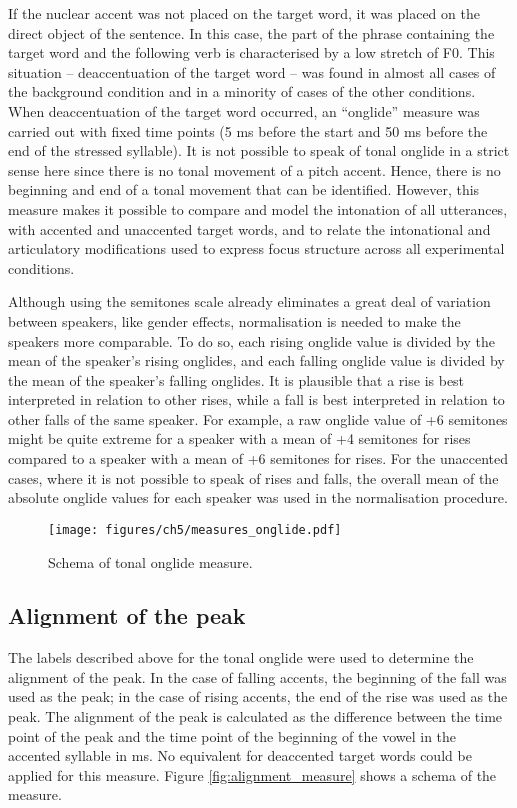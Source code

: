 If the nuclear accent was not placed on the target word, it was placed on the direct object of the sentence. In this case, the part of the phrase containing the target word and the following verb is characterised by a low stretch of F0. This situation -- deaccentuation of the target word -- was found in almost all cases of the background condition and in a minority of cases of the other conditions. When deaccentuation of the target word occurred, an ``onglide” measure was carried out with fixed time points (5 ms before the start and 50 ms before the end of the stressed syllable). It is not possible to speak of tonal onglide in a strict sense here since there is no tonal movement of a pitch accent. Hence, there is no beginning and end of a tonal movement that can be identified. However, this measure makes it possible to compare and model the intonation of all utterances, with accented and unaccented target words, and to relate the intonational and articulatory modifications used to express focus structure across all experimental conditions.

Although using the semitones scale already eliminates a great deal of variation between speakers, like gender effects, normalisation is needed to make the speakers more comparable. To do so, each rising onglide value is divided by the mean of the speaker’s rising onglides, and each falling onglide value is divided by the mean of the speaker’s falling onglides. It is plausible that a rise is best interpreted in relation to other rises, while a fall is best interpreted in relation to other falls of the same speaker. For example, a raw onglide value of +6 semitones might be quite extreme for a speaker with a mean of +4 semitones for rises compared to a speaker with a mean of +6 semitones for rises. For the unaccented cases, where it is not possible to speak of rises and falls, the overall mean of the absolute onglide values for each speaker was used in the normalisation procedure.

\begin{figure}
\texttt{[image: figures/ch5/measures\_onglide.pdf]}
\caption{Schema of tonal onglide measure.}
\label{fig:onglide_measure}
\end{figure}

\subsection{Alignment of the peak}

The labels described above for the tonal onglide were used to determine the alignment of the peak. In the case of falling accents, the beginning of the fall was used as the peak; in the case of rising accents, the end of the rise was used as the peak. The alignment of the peak is calculated as the difference between the time point of the peak and the time point of the beginning of the vowel in the accented syllable in ms. No equivalent for deaccented target words could be applied for this measure. Figure \ref{fig:alignment_measure} shows a schema of the measure.

